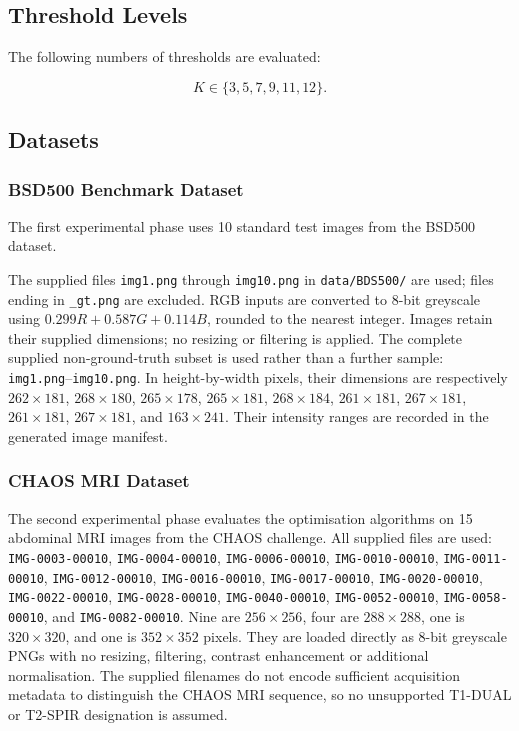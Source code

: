 \documentclass[review,authoryear]{elsarticle}
\begin{document}
\subsection{Threshold Levels}

The following numbers of thresholds are evaluated:

\begin{equation}
K \in \{3,5,7,9,11,12\}.
\end{equation}


\subsection{Datasets}


\subsubsection{BSD500 Benchmark Dataset}

The first experimental phase uses 10 standard test images from the
BSD500 dataset.

The supplied files \texttt{img1.png} through \texttt{img10.png} in
\texttt{data/BDS500/} are used; files ending in \texttt{\_gt.png} are
excluded. RGB inputs are converted to 8-bit greyscale using
$0.299R+0.587G+0.114B$, rounded to the nearest integer. Images retain their
supplied dimensions; no resizing or filtering is applied.
The complete supplied non-ground-truth subset is used rather than a further
sample: \texttt{img1.png}--\texttt{img10.png}. In height-by-width pixels,
their dimensions are respectively $262\times181$, $268\times180$,
$265\times178$, $265\times181$, $268\times184$, $261\times181$,
$267\times181$, $261\times181$, $267\times181$, and $163\times241$.
Their intensity ranges are recorded in the generated image manifest.


\subsubsection{CHAOS MRI Dataset}

The second experimental phase evaluates the optimisation algorithms on
15 abdominal MRI images from the CHAOS challenge. All supplied files are used:
\texttt{IMG-0003-00010}, \texttt{IMG-0004-00010},
\texttt{IMG-0006-00010}, \texttt{IMG-0010-00010},
\texttt{IMG-0011-00010}, \texttt{IMG-0012-00010},
\texttt{IMG-0016-00010}, \texttt{IMG-0017-00010},
\texttt{IMG-0020-00010}, \texttt{IMG-0022-00010},
\texttt{IMG-0028-00010}, \texttt{IMG-0040-00010},
\texttt{IMG-0052-00010}, \texttt{IMG-0058-00010}, and
\texttt{IMG-0082-00010}. Nine are $256\times256$, four are
$288\times288$, one is $320\times320$, and one is $352\times352$ pixels.
They are loaded directly as 8-bit greyscale PNGs with no resizing, filtering,
contrast enhancement or additional normalisation. The supplied filenames do
not encode sufficient acquisition metadata to distinguish the CHAOS MRI
sequence, so no unsupported T1-DUAL or T2-SPIR designation is assumed.
\end{document}
